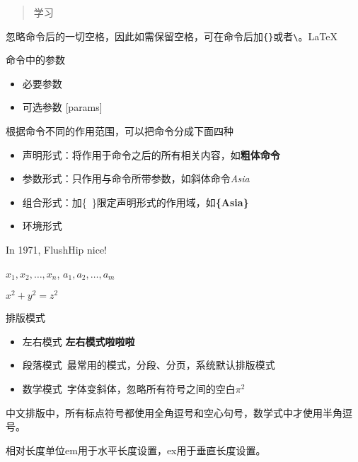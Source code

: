 \documentclass[a4paper, onecolumn, 10pt, space]{ctexart}
\begin{document}
\setlength{\parindent}{0pt}
\setlength{\columnsep}{3em}
\setlength{\columnseprule}{0.4pt}

\begin{abstract}
    学习\LaTeXe{}
\end{abstract}

\begin{center}
    \large \METAFONT{}
\end{center}

\vspace{2em}

\noindent{}\LaTeXe{}忽略命令后的一切空格，因此如需保留空格，可在命令后加\verb"{"\verb"}"\textvisiblespace{}或者\verb"\"\textvisiblespace{}。\LaTeX\

命令中的参数
\begin{itemize}
    \item 必要参数 \textbraceright{}
    \item 可选参数 [params]
\end{itemize}

根据命令不同的作用范围，可以把命令分成下面四种
\begin{itemize}
    \item 声明形式：将作用于命令之后的所有相关内容，如{\bfseries 粗体命令}
    \item 参数形式：只作用与命令所带参数，如斜体命令\textsl{Asia}
    \item 组合形式：加\{\ \}限定声明形式的作用域，如{\bfseries \{Asia\}}
    \item 环境形式
\end{itemize}

\newcommand{\name}{FlushHip}
In 1971, \name{} nice!

\newcommand{\shulie}[2][n]{\(#2_1, #2_2, \dots, #2_#1\)}
\shulie{x}, \shulie[m]{a}

\ensuremath{x^2 + y^2 = z^2}

排版模式
\begin{itemize}
    \item 左右模式 \mbox{\bfseries 左右模式啦啦啦}
    \item 段落模式\ 最常用的模式，分段、分页，系统默认排版模式
    \item 数学模式~字体变斜体，忽略所有符号之间的空白\(\pi ^ 2\)
\end{itemize}

中文排版中，所有标点符号都使用全角逗号和空心句号，数学式中才使用半角逗号。

相对长度单位em用于水平长度设置，ex用于垂直长度设置。
\end{document}
